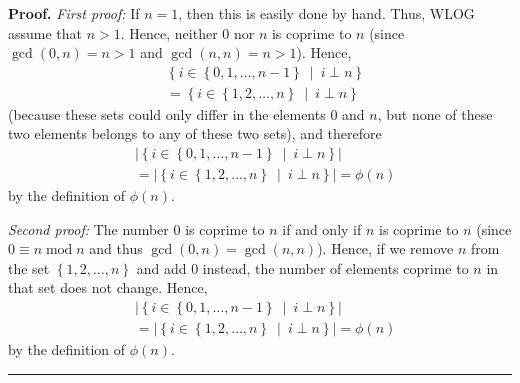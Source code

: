\documentclass[numbers=enddot,12pt,final,onecolumn,notitlepage]{scrartcl}%
\numberwithin{exer}{subsection}
\theoremstyle{definition}
\newenvironment{proof}[1][Proof]{\noindent\textbf{#1.} }{\ \rule{0.5em}{0.5em}}
\begin{document}
\begin{proof}
\textit{First proof:} If $n=1$, then this is easily done by hand. Thus, WLOG
assume that $n>1$. Hence, neither $0$ nor $n$ is coprime to $n$ (since
$\gcd\left(  0,n\right)  =n>1$ and $\gcd\left(  n,n\right)  =n>1$). Hence,%
\begin{align*}
&  \left\{  i\in\left\{  0,1,\ldots,n-1\right\}  \ \mid\ i\perp n\right\} \\
&  =\left\{  i\in\left\{  1,2,\ldots,n\right\}  \ \mid\ i\perp n\right\}
\end{align*}
(because these sets could only differ in the elements $0$ and $n$, but none of
these two elements belongs to any of these two sets), and therefore%
\begin{align*}
&  \left\vert \left\{  i\in\left\{  0,1,\ldots,n-1\right\}  \ \mid\ i\perp
n\right\}  \right\vert \\
&  =\left\vert \left\{  i\in\left\{  1,2,\ldots,n\right\}  \ \mid\ i\perp
n\right\}  \right\vert =\phi\left(  n\right)
\end{align*}
by the definition of $\phi\left(  n\right)  $.

\textit{Second proof:} The number $0$ is coprime to $n$ if and only if $n$ is
coprime to $n$ (since $0\equiv n\operatorname{mod}n$ and thus $\gcd\left(
0,n\right)  =\gcd\left(  n,n\right)  $). Hence, if we remove $n$ from the set
$\left\{  1,2,\ldots,n\right\}  $ and add $0$ instead, the number of elements
coprime to $n$ in that set does not change. Hence,%
\begin{align*}
&  \left\vert \left\{  i\in\left\{  0,1,\ldots,n-1\right\}  \ \mid\ i\perp
n\right\}  \right\vert \\
&  =\left\vert \left\{  i\in\left\{  1,2,\ldots,n\right\}  \ \mid\ i\perp
n\right\}  \right\vert =\phi\left(  n\right)
\end{align*}
by the definition of $\phi\left(  n\right)  $.
\end{proof}
\end{document}
